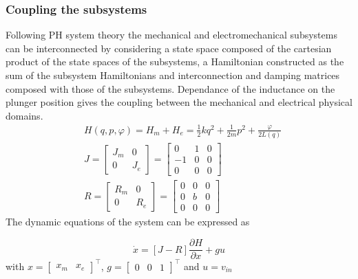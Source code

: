 \documentclass[letterpaper, 10pt, conference]{ieeeconf}
\begin{document}
\subsubsection{Coupling the subsystems}
Following PH system theory the mechanical and electromechanical subsystems can be interconnected by considering a state space composed of the cartesian product of the state spaces of the subsystems, a Hamiltonian constructed as the sum of the subsystem Hamiltonians and interconnection and damping matrices composed with those of the subsystems. Dependance of the inductance on the plunger position gives the coupling between the mechanical and electrical physical domains.
\begin{align}
    &H(q,p,\varphi) = H_m + H_e = \frac{1}{2}kq^2 + \frac{1}{2m} p^2 + \frac{\varphi}{2 L(q)}\\
    &J = \begin{bmatrix}
        J_m & 0 \\ 0 & J_e
    \end{bmatrix}  = \begin{bmatrix}
        0 & 1 & 0 \\ 
        -1 & 0 & 0 \\
        0 & 0 & 0
    \end{bmatrix}\\
    &R = \begin{bmatrix}
        R_m & 0 \\ 0 & R_e
    \end{bmatrix} = \begin{bmatrix}
        0 & 0 & 0 \\
        0 & b & 0\\
        0 & 0 & 0
    \end{bmatrix}
\end{align}
The dynamic equations of the system can be expressed as

\begin{equation}
    \dot{x} = [J-R]\frac{\partial H}{\partial x} + gu \label{eq:plunger_original_PCH}
\end{equation}
with $x = \begin{bmatrix}
    x_m & x_e
\end{bmatrix}^\top$, $g=\begin{bmatrix}
    0 & 0 & 1
\end{bmatrix}^\top$ and $u=v_{in}$
\end{document}
